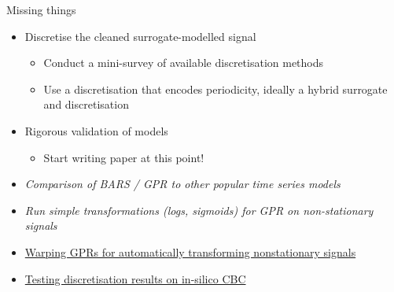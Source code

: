 \documentclass[presentation]{beamer}
\begin{document}
\begin{frame}[label={sec:orgf14c489}]{Missing things}
\begin{itemize}[<+->]
\item Discretise the cleaned surrogate-modelled signal
\begin{itemize}
\item Conduct a mini-survey of available discretisation methods
\item Use a discretisation that encodes periodicity, ideally a hybrid surrogate and discretisation
\end{itemize}
\item Rigorous validation of models
\begin{itemize}
\item Start writing paper at this point!
\end{itemize}
\item \emph{Comparison of BARS / GPR to other popular time series models}
\item \emph{Run simple transformations (logs, sigmoids) for GPR on non-stationary signals}
\item \uline{Warping GPRs for automatically transforming nonstationary signals}
\item \uline{Testing discretisation results on in-silico CBC}
\end{itemize}
\end{frame}
\end{document}
